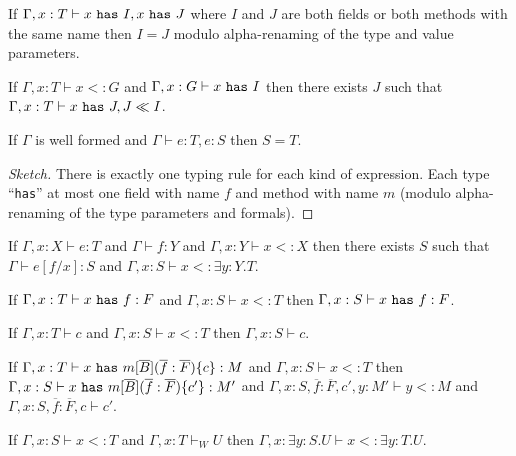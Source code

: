 \begin{lem}
If $\Gamma,x:T\vdash x~{\tt has}~I,x~{\tt has}~J$ where $I$ and $J$ are both fields or both methods with the same name then $I=J$ modulo alpha-renaming of the type and value parameters.
\end{lem}

\begin{lem}
If $\Gamma,x:T\vdash x<:G$ and $\Gamma,x:G\vdash x~{\tt has}~I$ then there exists $J$ such that $\Gamma,x:T\vdash x~{\tt has}~J,J \ll I$.
\end{lem}



\begin{lem}\label{uni}
If $\Gamma$ is well formed and $\Gamma\vdash e:T,e:S$ then $S=T$.
\end{lem}

\begin{proof}[Sketch]
There is exactly one typing rule for each kind of expression. Each type ``{\tt has}'' at most one field with name $f$ and method with name $m$ (modulo alpha-renaming of the type parameters and formals).
\end{proof}

\begin{lem}\label{sub}
If $\Gamma,x:X\vdash e:T$ and $\Gamma\vdash f:Y$ and $\Gamma,x:Y\vdash x<:X$ then there exists $S$ such that $\Gamma\vdash e[f/x]:S$ and $\Gamma,x:S\vdash x<:\exists y:Y.T$.
\end{lem}

\begin{lem}\label{suf}
If $\Gamma,x:T\vdash x~{\tt has}~f:F$ and $\Gamma,x:S\vdash x<:T$ then $\Gamma,x:S\vdash x~{\tt has}~f:F$.
\end{lem}

\begin{lem}\label{suc}
If $\Gamma,x:T\vdash c$ and $\Gamma,x:S\vdash x<:T$ then $\Gamma,x:S\vdash c$.
\end{lem}

\begin{lem}\label{sum}
	If $\Gamma,x:T\vdash x~{\tt has}~m[\overline{B}](\overline{f}:\overline{F})\{c\}:M$ and $\Gamma,x:S\vdash x<:T$ then $\Gamma,x:S\vdash x~{\tt has}~m[\overline{B}](\overline{f}:\overline{F})\{c'\}:M'$ and $\Gamma,x:S,\overline{f}:\overline{F},c',y:M'\vdash y<:M$ and $\Gamma,x:S,\overline{f}:\overline{F},c\vdash c'$.
	\end{lem}

\begin{lem}\label{sue}
If $\Gamma,x:S\vdash x<:T$ and $\Gamma,x:T\vdash_W U$ then $\Gamma, x:\exists y:S.U\vdash x<:\exists y:T.U$.
\end{lem}

